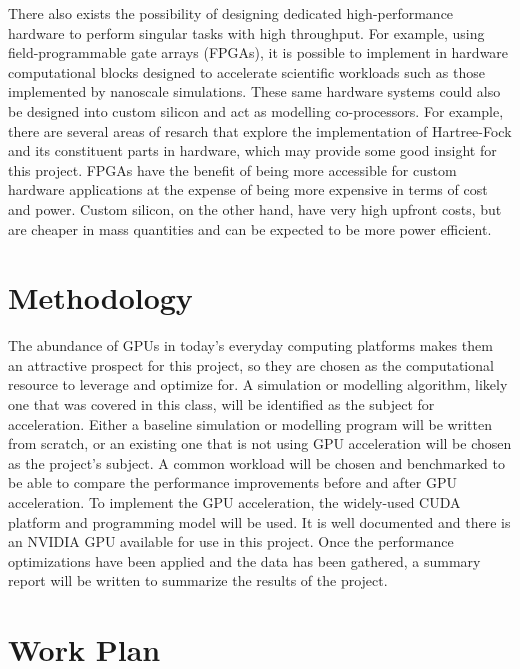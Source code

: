 \documentclass[10pt, oneside, letterpaper]{article}
\begin{document}
There also exists the possibility of designing dedicated high-performance hardware to perform singular tasks with high throughput. For example, using field-programmable gate arrays (FPGAs), it is possible to implement in hardware computational blocks designed to accelerate scientific workloads such as those implemented by nanoscale simulations. These same hardware systems could also be designed into custom silicon and act as modelling co-processors. For example, there are several \cite{fpga-hf}\cite{hardware-implementation-of-the-exponent-based-computational-core-for-an-exchange-correlation-potential-matrix-generation}\cite{special-purpose-hf-computer} areas of resarch that explore the implementation of Hartree-Fock and its constituent parts in hardware, which may provide some good insight for this project. FPGAs have the benefit of being more accessible for custom hardware applications at the expense of being more expensive in terms of cost and power. Custom silicon, on the other hand, have very high upfront costs, but are cheaper in mass quantities and can be expected to be more power efficient.

\section{Methodology}

The abundance of GPUs in today's everyday computing platforms makes them an attractive prospect for this project, so they are chosen as the computational resource to leverage and optimize for. A simulation or modelling algorithm, likely one that was covered in this class, will be identified as the subject for acceleration. Either a baseline simulation or modelling program will be written from scratch, or an existing one that is not using GPU acceleration will be chosen as the project's subject. A common workload will be chosen and benchmarked to be able to compare the performance improvements before and after GPU acceleration. To implement the GPU acceleration, the widely-used CUDA \cite{nvidia-cuda} platform and programming model will be used. It is well documented and there is an NVIDIA GPU available for use in this project. Once the performance optimizations have been applied and the data has been gathered, a summary report will be written to summarize the results of the project.

\section{Work Plan}
\end{document}
